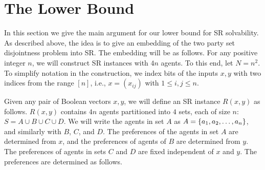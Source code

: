 \section{The Lower Bound}\label{sec:lb}

In this section we give the main argument for our lower bound for SR solvability. As described above, the idea is to give an embedding of the two party set disjointness problem into SR. The embedding will be as follows. For any positive integer $n$, we will construct SR instances with $4 n$ agents. To this end, let $N = n^2$. To simplify notation in the construction, we index bits of the inputs $x, y$ with two indices from the range $[n]$, i.e., $x = (x_{ij})$ with $1 \leq i, j \leq n$.

Given any pair of Boolean vectors $x, y$, we will define an SR instance $R(x, y)$ as follows. $R(x, y)$ contains $4 n$ agents partitioned into $4$ sets, each of size $n$: $S = A \cup B \cup C \cup D$. We will write the agents in set $A$ as $A = \left\{a_1, a_2, \ldots, a_n\right\}$, and similarly with $B$, $C$, and $D$. The preferences of the agents in set $A$ are determined from $x$, and the preferences of agents of $B$ are determined from $y$. The preferences of agents in sets $C$ and $D$ are fixed independent of $x$ and $y$. The preferences are determined as follows.

